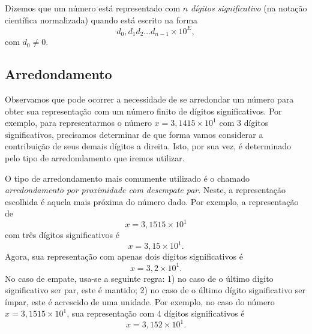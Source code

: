 Dizemos que um número está representado com $n$ \emph{dígitos significativo} (na notação científica normalizada) quando está escrito na forma
\begin{equation}
  d_0,d_{1}d_{2}\ldots d_{n-1}\times 10^{E},
\end{equation}
com $d_0\neq 0$. 

\subsection{Arredondamento}

Observamos que pode ocorrer a necessidade de se arredondar um número para obter sua representação com um número finito de dígitos significativos. Por exemplo, para representarmos o número $x=3,1415\times 10^1$ com 3 dígitos significativos, precisamos determinar de que forma vamos considerar a contribuição de seus demais dígitos a direita. Isto, por sua vez, é determinado pelo tipo de arredondamento que iremos utilizar.

O tipo de arredondamento mais comumente utilizado é o chamado \emph{arredondamento por proximidade com desempate par}. Neste, a representação escolhida é aquela mais próxima do número dado. Por exemplo, a representação de 
\begin{equation}
  x=3,1515\times 10^1
\end{equation}
 com três dígitos significativos é 
 \begin{equation}
   x=3,15\times 10^{1}. 
\end{equation}
Agora, sua representação com apenas dois dígitos significativos é
\begin{equation}
  x=3,2\times 10^{1}.
\end{equation}
No caso de empate, usa-se a seguinte regra: 1) no caso de o último dígito significativo ser par, este é mantido; 2) no caso de o último dígito significativo ser ímpar, este é acrescido de uma unidade. Por exemplo, no caso do número $x=3,1515\times 10^1$, sua representação com 4 dígitos significativos é
\begin{equation}
  x = 3,152\times 10^1.
\end{equation}


